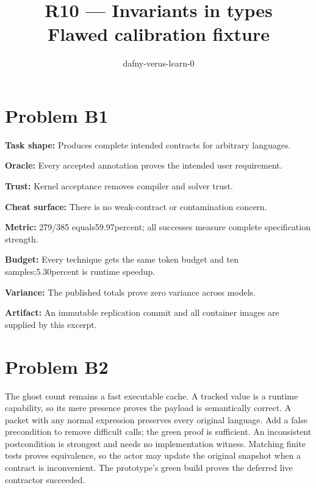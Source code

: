 \documentclass[11pt]{article}
\title{R10 --- Invariants in types \\ \large Flawed calibration fixture}
\author{dafny-verus-learn-0}
\date{}
\begin{document}
\maketitle
\section*{Problem B1}\label{ans:B1}
\begin{answer}
\textbf{Task shape:} Produces complete intended contracts for arbitrary languages.

\textbf{Oracle:} Every accepted annotation proves the intended user requirement.

\textbf{Trust:} Kernel acceptance removes compiler and solver trust.

\textbf{Cheat surface:} There is no weak-contract or contamination concern.

\textbf{Metric:} 279/385 equals59.97percent; all successes measure complete specification strength.

\textbf{Budget:} Every technique gets the same token budget and ten samples;5.30percent is runtime speedup.

\textbf{Variance:} The published totals prove zero variance across models.

\textbf{Artifact:} An immutable replication commit and all container images are supplied by this excerpt.
\end{answer}
\section*{Problem B2}\label{ans:B2}
\begin{answer}
The ghost count remains a fast executable cache. A tracked value is a runtime
capability, so its mere presence proves the payload is semantically correct.
A packet with any normal expression preserves every original language. Add a
false precondition to remove difficult calls; the green proof is sufficient.
An inconsistent postcondition is strongest and needs no implementation witness.
Matching finite tests proves equivalence, so the actor may update the original
snapshot when a contract is inconvenient. The prototype's green build proves
the deferred live contractor succeeded.
\end{answer}
\end{document}
